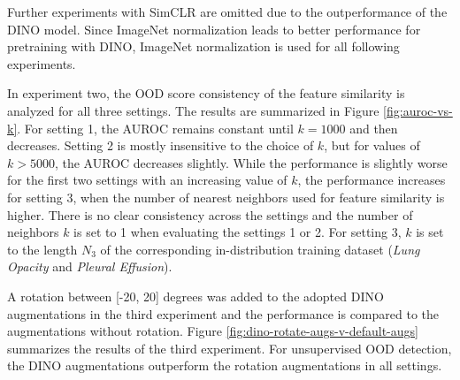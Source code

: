 Further experiments with SimCLR are omitted due to the outperformance of the DINO model.
Since ImageNet normalization leads to better performance for pretraining with DINO, ImageNet normalization is used for all following experiments.
\par
In experiment two, the OOD score consistency of the feature similarity is analyzed for all three settings.
The results are summarized in Figure \ref{fig:auroc-vs-k}.
For setting 1, the AUROC remains constant until $k=1000$ and then decreases.
Setting 2 is mostly insensitive to the choice of $k$, but for values of $k>5000$, the AUROC decreases slightly.
While the performance is slightly worse for the first two settings with an increasing value of $k$, the performance increases for setting 3, when the number of nearest neighbors used for feature similarity is higher.
There is no clear consistency across the settings and the number of neighbors $k$ is set to 1 when evaluating the settings 1 or 2.
For setting 3, $k$ is set to the length $N_3$ of the corresponding in-distribution training dataset (\textit{Lung Opacity} and \textit{Pleural Effusion}).
\par
A rotation between [-20, 20] degrees was added to the adopted DINO augmentations in the third experiment and the performance is compared to the augmentations without rotation.
Figure \ref{fig:dino-rotate-augs-v-default-augs} summarizes the results of the third experiment.
For unsupervised OOD detection, the DINO augmentations outperform the rotation augmentations in all settings.

